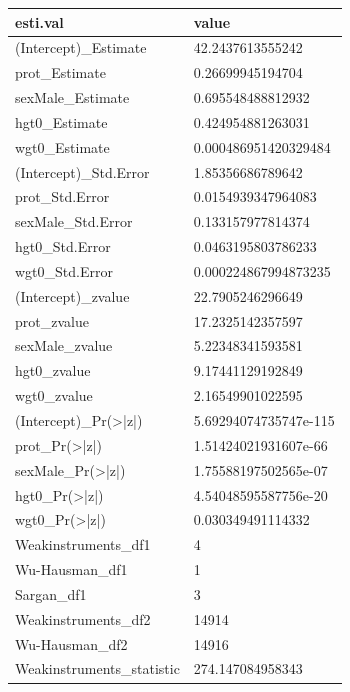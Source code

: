 \documentclass[
]{book}
\begin{document}
\begin{table}[!h]
\centering
\begin{tabular}{l|l}
\hline
esti.val & value\\
\hline
\rowcolor{gray!6}  (Intercept)\_Estimate & 42.2437613555242\\
\hline
prot\_Estimate & 0.26699945194704\\
\hline
\rowcolor{gray!6}  sexMale\_Estimate & 0.695548488812932\\
\hline
hgt0\_Estimate & 0.424954881263031\\
\hline
\rowcolor{gray!6}  wgt0\_Estimate & 0.000486951420329484\\
\hline
(Intercept)\_Std.Error & 1.85356686789642\\
\hline
\rowcolor{gray!6}  prot\_Std.Error & 0.0154939347964083\\
\hline
sexMale\_Std.Error & 0.133157977814374\\
\hline
\rowcolor{gray!6}  hgt0\_Std.Error & 0.0463195803786233\\
\hline
wgt0\_Std.Error & 0.000224867994873235\\
\hline
\rowcolor{gray!6}  (Intercept)\_zvalue & 22.7905246296649\\
\hline
prot\_zvalue & 17.2325142357597\\
\hline
\rowcolor{gray!6}  sexMale\_zvalue & 5.22348341593581\\
\hline
hgt0\_zvalue & 9.17441129192849\\
\hline
\rowcolor{gray!6}  wgt0\_zvalue & 2.16549901022595\\
\hline
(Intercept)\_Pr(>|z|) & 5.69294074735747e-115\\
\hline
\rowcolor{gray!6}  prot\_Pr(>|z|) & 1.51424021931607e-66\\
\hline
sexMale\_Pr(>|z|) & 1.75588197502565e-07\\
\hline
\rowcolor{gray!6}  hgt0\_Pr(>|z|) & 4.54048595587756e-20\\
\hline
wgt0\_Pr(>|z|) & 0.030349491114332\\
\hline
\rowcolor{gray!6}  Weakinstruments\_df1 & 4\\
\hline
Wu-Hausman\_df1 & 1\\
\hline
\rowcolor{gray!6}  Sargan\_df1 & 3\\
\hline
Weakinstruments\_df2 & 14914\\
\hline
\rowcolor{gray!6}  Wu-Hausman\_df2 & 14916\\
\hline
Weakinstruments\_statistic & 274.147084958343\\

\end{tabular}
\end{table}
\end{document}
